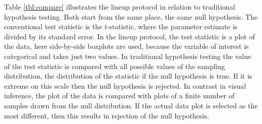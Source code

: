 \documentclass{article}
\begin{document}
Table \ref{tbl:compare} illustrates the lineup protocol in relation to traditional hypothesis testing. Both start from the same place, the same null hypothesis. The conventional test statistic is the $t$-statistic, where the parameter estimate is divided by its standard error. In the lineup protocol, the test statistic is a plot of the data, here side-by-side boxplots are used, because the variable of interest is categorical and takes just two values. In traditional hypothesis testing the value of the test statistic is compared with all possible values of the sampling distribution, the distribution of the statistic if the null hypothesis is true. If it is extreme on this scale then the null hypothesis is rejected. In contrast in visual inference, the plot of the data is compared with plots of a finite number of samples drawn from the null distribution. If the actual data plot is selected as the most different, then this results in rejection of the null hypothesis.
\end{document}
